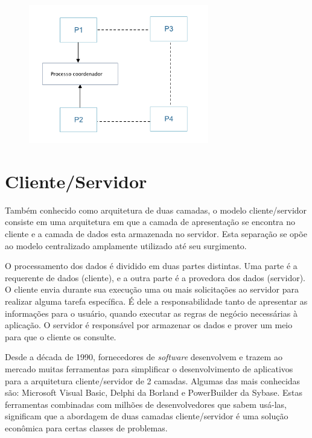 \begin{figure}[htbp]
    \centering
    \includegraphics[width=0.7\textwidth]{figuras/ipc.png}
    \label{fig:how-communication-works}
\end{figure}

\section{Cliente/Servidor}\label{sec:clientserver}

Também conhecido como arquitetura de duas camadas, o modelo cliente/servidor consiste em uma arquitetura em que a camada de apresentação se encontra no cliente e a camada de dados esta armazenada no servidor. Esta separação se opõe ao modelo centralizado amplamente utilizado até seu surgimento.

O processamento dos dados é dividido em duas partes distintas. Uma parte é a requerente de dados (cliente), e a outra parte é a provedora dos dados (servidor). O cliente envia durante sua execução uma ou mais solicitações ao servidor para realizar alguma tarefa específica. É dele a responsabilidade tanto de apresentar as informações para o usuário, quando executar as regras de negócio necessárias à aplicação. O servidor é responsável por armazenar os dados e prover um meio para que o cliente os consulte.

Desde a década de 1990, fornecedores de \textit{software} desenvolvem e trazem ao mercado muitas ferramentas para simplificar o desenvolvimento de aplicativos para a arquitetura cliente/servidor de 2 camadas. Algumas das mais conhecidas são: Microsoft Visual Basic, Delphi da Borland e PowerBuilder da Sybase. Estas ferramentas combinadas com milhões de desenvolvedores que sabem usá-las, significam que a abordagem de duas camadas cliente/servidor é uma solução econômica para certas classes de problemas.

